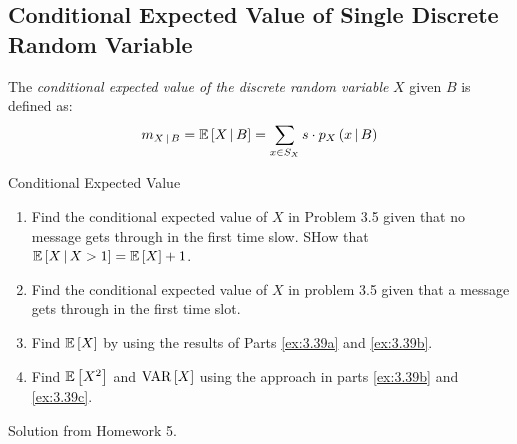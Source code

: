	\subsection{Conditional Expected Value of Single Discrete Random Variable} \label{subsec:Conditional Expected Value of Single Discrete}
		\begin{definition} \label{def:Conditional Expected Value of Single Discrete}
			The \emph{conditional expected value of the discrete random variable} $X$ given $B$ is defined as:
			\begin{equation} \label{eq:Conditional Expected Value of Single Discrete}
				m_{X \operatorname{\vert} B} = \operatorname{\operatorname{\mathbb{E}}} \left[ X \operatorname{\vert} B \right] = \sum\limits_{x \in S_{X}} s \cdot p_{X} \left( x \operatorname{\vert} B \right)
			\end{equation}
		\end{definition}
		\begin{example}[Problem 3.39]{Conditional Expected Value}
			\begin{enumerate}[label=\textbf{(\alph*)}, ref=(\alph*)]
				\item Find the conditional expected value of $X$ in Problem 3.5 given that no message gets through in the first time slow. SHow that $\operatorname{\operatorname{\mathbb{E}}} \left[ X \operatorname{\vert} X>1 \right] = \operatorname{\operatorname{\mathbb{E}}} \left[ X \right] + 1$. \label{ex:3.39a}
				\item Find the conditional expected value of $X$ in problem 3.5 given that a message gets through in the first time slot. \label{ex:3.39b}
				\item Find $\operatorname{\operatorname{\mathbb{E}}} \left[ X \right]$ by using the results of Parts \ref{ex:3.39a} and \ref{ex:3.39b}. \label{ex:3.39c}
				\item Find $\operatorname{\operatorname{\mathbb{E}}} \left[ X^{2} \right]$ and $\operatorname{\operatorname{VAR}} \left[ X \right]$ using the approach in parts \ref{ex:3.39b} and \ref{ex:3.39c}.
			\end{enumerate}
		
			\tcblower
			
			Solution from Homework 5.
		\end{example}
	

